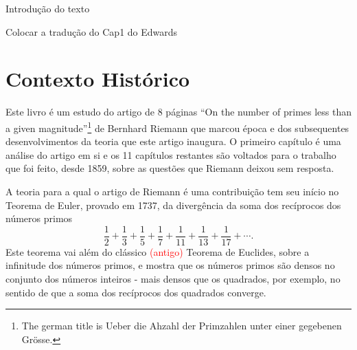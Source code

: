 Introdução do texto

Colocar a tradução do Cap1 do Edwards

    \section*{Contexto Histórico}

    Este livro é um estudo do artigo de 8 páginas ``On the number of primes less than a given magnitude''\footnote{The german title is Ueber die Ahzahl der Primzahlen unter einer gegebenen Grösse.} de Bernhard Riemann que marcou época e dos subsequentes desenvolvimentos da teoria que este artigo inaugura. O primeiro capítulo é uma análise do artigo em si e os 11 capítulos restantes são voltados para o trabalho que foi feito, desde 1859, sobre as questões que Riemann deixou sem resposta.

    A teoria para a qual o artigo de Riemann é uma contribuição tem seu início no Teorema de Euler, provado em 1737, da divergência da soma dos recíprocos dos números primos
    \begin{equation}
    \label{Soma-Recip-primos}
    \frac{1}{2} + \frac{1}{3} + \frac{1}{5} + \frac{1}{7} + \frac{1}{11} + \frac{1}{13} + \frac{1}{17} + \cdots.
    \end{equation}
    Este teorema vai além do clássico \textcolor{red}{(antigo)} Teorema de Euclides, sobre a infinitude dos números primos, e mostra que os números primos são densos no conjunto dos números inteiros - mais densos que os quadrados, por exemplo, no sentido de que a soma dos recíprocos dos quadrados converge.
    
